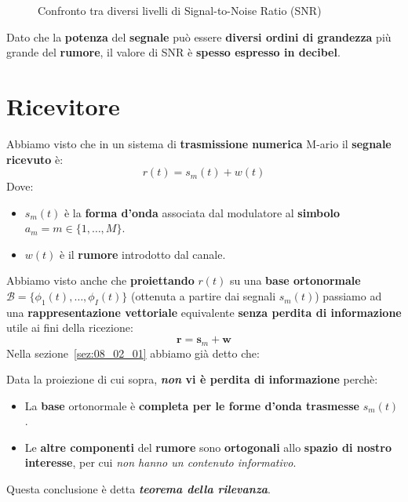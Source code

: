 \begin{figure}[!ht]
    \caption{Confronto tra diversi livelli di Signal-to-Noise Ratio (SNR)}
    \label{fig:08_07_EsempiSNR}
\end{figure}

\begin{remark}
    Dato che la \textbf{potenza} del \textbf{segnale} può essere 
    \textbf{diversi ordini di grandezza} più grande del \textbf{rumore},
    il valore di SNR è \textbf{spesso espresso in decibel}.
\end{remark}

\section{Ricevitore}

Abbiamo visto che in un sistema di \textbf{trasmissione numerica} M-ario il
\textbf{segnale ricevuto} è:
\[
    r(t) = s_m(t) + w(t)
\]
Dove:
\begin{itemize}
    \item $s_m(t)$ è la \textbf{forma d'onda} associata dal modulatore al \textbf{simbolo}
        $a_m = m \in \{1,\ldots ,M\}$.
    \item $w(t)$ è il \textbf{rumore} introdotto dal canale.
\end{itemize}

Abbiamo visto anche che \textbf{proiettando} $r(t)$ su una 
\textbf{base ortonormale} $\mathcal{B}=\{\phi_{1}(t),\ldots ,\phi_I(t)\}$ 
(ottenuta a partire dai segnali $s_m(t)$) passiamo ad una \textbf{rappresentazione vettoriale}
equivalente \textbf{senza perdita di informazione} utile ai fini della ricezione:
\[
    \mathbf{r} = \mathbf{s}_m + \mathbf{w}
\]
Nella sezione~\ref{sez:08_02_01} abbiamo già detto che:

\begin{remark}
    Data la proiezione di cui sopra, \textbf{\textit{non} vi è perdita di informazione} 
    perchè:
    \begin{itemize}
        \item La \textbf{base} ortonormale è \textbf{completa per le forme d'onda trasmesse} $s_m(t)$.
        \item Le \textbf{altre componenti} del \textbf{rumore} sono \textbf{ortogonali} allo
        \textbf{spazio di nostro interesse}, per cui \textit{non hanno un contenuto informativo}.
    \end{itemize}
    Questa conclusione è detta \textbf{\textit{teorema della rilevanza}}.
\end{remark}

